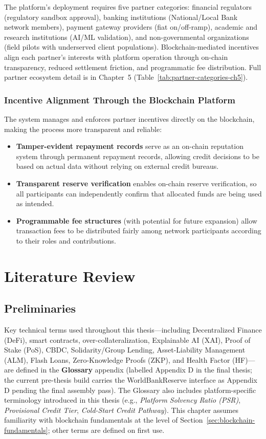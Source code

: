 \documentclass[12pt,a4paper]{report}
\begin{document}
The platform's deployment requires five partner categories: financial regulators (regulatory sandbox approval), banking institutions (National/Local Bank network members), payment gateway providers (fiat on/off-ramp), academic and research institutions (AI/ML validation), and non-governmental organizations (field pilots with underserved client populations). Blockchain-mediated incentives align each partner's interests with platform operation through on-chain transparency, reduced settlement friction, and programmatic fee distribution. Full partner ecosystem detail is in Chapter~5 (Table~\ref{tab:partner-categories-ch5}).

\subsection{Incentive Alignment Through the Blockchain Platform}

The system manages and enforces partner incentives directly on the blockchain, making the process more transparent and reliable:

\begin{itemize}[noitemsep]
\item \textbf{Tamper-evident repayment records} serve as an on-chain reputation system through permanent repayment records, allowing credit decisions to be based on actual data without relying on external credit bureaus.
\item \textbf{Transparent reserve verification} enables on-chain reserve verification, so all participants can independently confirm that allocated funds are being used as intended.
\item \textbf{Programmable fee structures} (with potential for future expansion) allow transaction fees to be distributed fairly among network participants according to their roles and contributions.
\end{itemize}


\chapter{Literature Review}

\section{Preliminaries}

Key technical terms used throughout this thesis---including Decentralized Finance (DeFi), smart contracts, over-collateralization, Explainable AI (XAI), Proof of Stake (PoS), CBDC, Solidarity/Group Lending, Asset-Liability Management (ALM), Flash Loans, Zero-Knowledge Proofs (ZKP), and Health Factor (HF)---are defined in the \textbf{Glossary} appendix (labelled Appendix D in the final thesis; the current pre-thesis build carries the WorldBankReserve interface as Appendix D pending the final assembly pass). The Glossary also includes platform-specific terminology introduced in this thesis (e.g., \textit{Platform Solvency Ratio (PSR)}, \textit{Provisional Credit Tier}, \textit{Cold-Start Credit Pathway}). This chapter assumes familiarity with blockchain fundamentals at the level of Section~\ref{sec:blockchain-fundamentals}; other terms are defined on first use.
\end{document}
